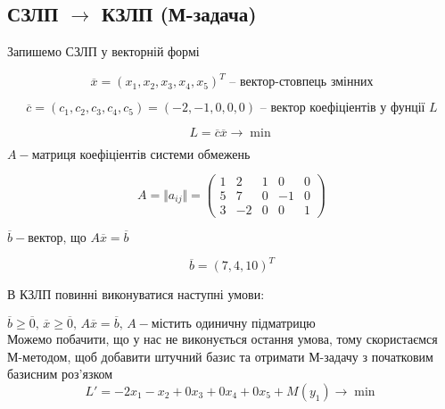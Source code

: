 \documentclass[a4paper, 12pt]{article}
\begin{document}
\subsection{СЗЛП $\rightarrow$ КЗЛП (М-задача)}

Запишемо СЗЛП у векторній формі

\begin{equation*}
\overline{x} = \left(x_1, x_2, x_3, x_4, x_5\right)^T \text{ -- вектор-стовпець змінних}
\end{equation*}

\begin{equation*}
\overline{c} = \left(c_1, c_2, c_3, c_4, c_5\right) = (-2,-1,0,0,0) \text{ -- вектор коефіціентів у фунції } L
\end{equation*}

\begin{equation*}
L = \overline{c}\overline{x} \rightarrow \min
\end{equation*}

$A - \text{матриця коефіціентів системи обмежень}$

\begin{equation*}
 A = \Vert a_{ij} \Vert = 
\begin{pmatrix}
	1 & 2 & 1 & 0 & 0\\
	5 & 7 & 0 & -1 & 0\\
	3 & -2 & 0 & 0 & 1
\end{pmatrix}
\end{equation*}

$ \overline{b} - \text{вектор, що } A\overline{x} = \overline{b} $

\begin{equation*}
 \overline{b} = \left( 7, 4, 10 \right)^T
\end{equation*}

В КЗЛП повинні виконуватися наступні умови:

$\overline{b} \geqslant \overline{0} \text{, } \overline{x} \geqslant \overline{0} \text{, } A\overline{x} = \overline{b} \text{, } A - \text{містить одиничну підматрицю}$\\

Можемо побачити, що у нас не виконується остання умова, тому скористаємся М-методом, щоб добавити штучний базис та отримати М-задачу з початковим базисним роз'язком\\

\begin{equation*}
L' = -2x_1 - x_2 + 0x_3 + 0x_4 + 0x_5 + M(y_1) \rightarrow \min
\end{equation*}
\end{document}

